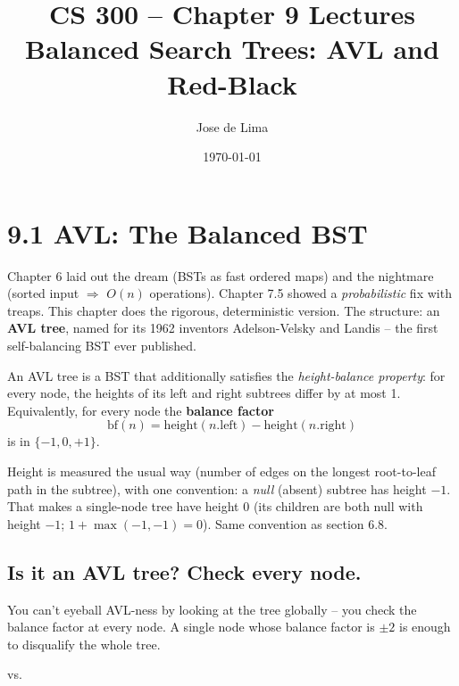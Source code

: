 \documentclass[11pt]{article}
\title{CS 300 -- Chapter 9 Lectures\\\large Balanced Search Trees: AVL and Red-Black}
\author{Jose de Lima}
\date{\today}
\begin{document}
\maketitle

\section{9.1 AVL: The Balanced BST}

Chapter 6 laid out the dream (BSTs as fast ordered maps) and the nightmare (sorted input $\Rightarrow$ $O(n)$ operations). Chapter 7.5 showed a \emph{probabilistic} fix with treaps. This chapter does the rigorous, deterministic version. The structure: an \textbf{AVL tree}, named for its 1962 inventors Adelson-Velsky and Landis -- the first self-balancing BST ever published.

\begin{defnbox}
An AVL tree is a BST that additionally satisfies the \emph{height-balance property}: for every node, the heights of its left and right subtrees differ by at most 1. Equivalently, for every node the \textbf{balance factor} \[\text{bf}(n) = \text{height}(n.\text{left}) - \text{height}(n.\text{right})\] is in $\{-1, 0, +1\}$.
\end{defnbox}

Height is measured the usual way (number of edges on the longest root-to-leaf path in the subtree), with one convention: a \emph{null} (absent) subtree has height $-1$. That makes a single-node tree have height $0$ (its children are both null with height $-1$; $1 + \max(-1, -1) = 0$). Same convention as section 6.8.

\subsection*{Is it an AVL tree? Check every node.}

You can't eyeball AVL-ness by looking at the tree globally -- you check the balance factor at every node. A single node whose balance factor is $\pm 2$ is enough to disqualify the whole tree.

\begin{center}
\quad vs. \quad
{}
\end{center}
\end{document}
